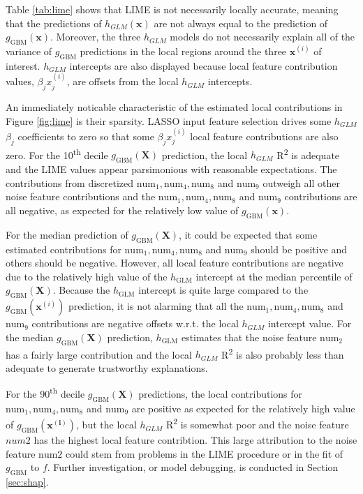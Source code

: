 \documentclass[11pt]{asaproc}
\begin{document}
Table \ref{tab:lime} shows that LIME is not necessarily locally accurate, meaning that the predictions of $h_{GLM}(\mathbf{x})$ are not always equal to the prediction of $g_{\text{GBM}}(\mathbf{x})$. Moreover, the three $h_{GLM}$ models do not necessarily explain all of the variance of $g_{\text{GBM}}$ predictions in the local regions around the three $\mathbf{x}^{(i)}$ of interest. $h_{GLM}$ intercepts are also displayed because local feature contribution values, $\beta_j x_j^{(i)}$, are offsets from the local $h_{GLM}$ intercepts.

An immediately noticable characteristic of the estimated local contributions in Figure \ref{fig:lime} is their sparsity. LASSO input feature selection drives some $h_{GLM}$ $\beta_j$ coefficients to zero so that some $\beta_j x_j^{(i)}$ local feature contributions are also zero. For the 10\textsuperscript{th} decile $g_{\text{GBM}}(\mathbf{X})$ prediction, the local $h_{GLM}$ R\textsuperscript{2} is adequate and the LIME values appear parsimonious with reasonable expectations. The contributions from discretized $\text{num}_1, \text{num}_4, \text{num}_8$ and $\text{num}_9$ outweigh all other noise feature contributions and the $\text{num}_1, \text{num}_4, \text{num}_8$ and $\text{num}_9$ contributions are all negative, as expected for the relatively low value of $g_{\text{GBM}}(\mathbf{x})$. 

For the median prediction of $g_{\text{GBM}}(\mathbf{X})$, it could be expected that some estimated contributions for $\text{num}_1, \text{num}_4, \text{num}_8$ and $\text{num}_9$ should be positive and others should be negative. However, all local feature contributions are negative due to the relatively high value of the $h_{\text{GLM}}$ intercept at the median percentile of $g_{\text{GBM}}(\mathbf{X})$. Because the $h_{\text{GLM}}$ intercept is quite large compared to the $g_{\text{GBM}}(\mathbf{x}^{(i)})$ prediction, it is not alarming that all the $\text{num}_1, \text{num}_4, \text{num}_8$ and $\text{num}_9$ contributions are negative offsets w.r.t. the local $h_{GLM}$ intercept value. For the median $g_{\text{GBM}}(\mathbf{X})$ prediction, $h_{\text{GLM}}$ estimates that the noise feature $\text{num}_2$ has a fairly large contribution and the local $h_{GLM}$ R\textsuperscript{2} is also probably less than adequate to generate trustworthy explanations.

For the 90\textsuperscript{th} decile $g_{\text{GBM}}(\mathbf{X})$ predictions, the local contributions for $\text{num}_1, \text{num}_4, \text{num}_8$ and $\text{num}_9$ are positive as expected for the relatively high value of $g_{\text{GBM}}(\mathbf{x^{(i)}})$, but the local $h_{GLM}$ R\textsuperscript{2} is somewhat poor and the noise feature $num2$ has the highest local feature contribtion. This large attribution to the noise feature $\text{num}2$ could stem from problems in the LIME procedure or in the fit of $g_{\text{GBM}}$ to $f$. Further investigation, or model debugging, is conducted in Section \ref{sec:shap}.
\end{document}

